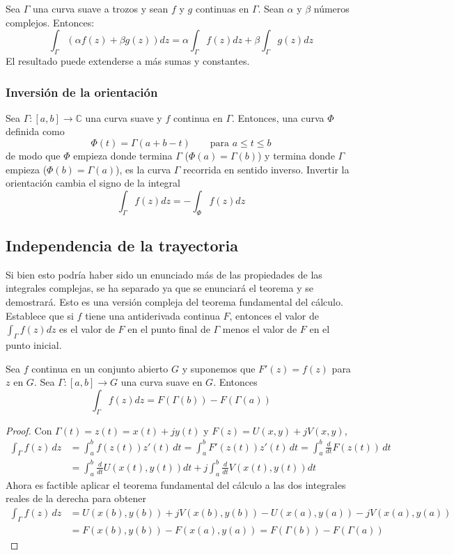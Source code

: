 Sea $\Gamma$ una curva suave a trozos y sean $f$ y $g$ continuas en $\Gamma$. Sean $\alpha$ y $\beta$ números complejos. Entonces:
$$
\int_\Gamma (\alpha f(z)+\beta g(z))dz = \alpha \int_\Gamma f(z) dz + \beta \int_\Gamma g(z)dz
$$
El resultado puede extenderse a más sumas y constantes.

\subsubsection{Inversión de la orientación}

Sea $\Gamma:[a,b]\to\mathbb{C}$ una curva suave y $f$ continua en $\Gamma$. Entonces, una curva $\varPhi$ definida como
$$
\varPhi(t)=\Gamma(a+b-t) \qquad \text{para } a\leqslant t \leqslant b
$$
de modo que $\varPhi$ empieza donde termina $\Gamma$ ($\varPhi(a)=\Gamma(b)$) y termina donde $\Gamma$ empieza ($\varPhi(b)=\Gamma(a)$), es la curva $\Gamma$ recorrida en sentido inverso. Invertir la orientación cambia el signo de la integral
$$
\int_\Gamma f(z)dz=-\int_\varPhi f(z)dz
$$

\subsection{Independencia de la trayectoria}

Si bien esto podría haber sido un enunciado más de las propiedades de las integrales complejas, se ha separado ya que se enunciará el teorema y se demostrará. Esto es una versión compleja del teorema fundamental del cálculo. Establece que si $f$ tiene una antiderivada continua $F$, entonces el valor de $\int_\Gamma f(z)dz$ es el valor de $F$ en el punto final de $\Gamma$ menos el valor de $F$ en el punto inicial.

\begin{theorem}\label{teo:independencia_de_la_trayectoria}
  Sea $f$ continua en un conjunto abierto $G$ y suponemos que $F'(z)=f(z)$ para $z$ en $G$. Sea $\Gamma:[a,b]\to G$ una curva suave en $G$. Entonces
  $$
  \int_\Gamma f(z)dz = F(\Gamma(b))-F(\Gamma(a))
  $$
\end{theorem}

\begin{proof}
  Con $\Gamma(t)=z(t)=x(t)+jy(t)$ y $F(z)=U(x,y)+jV(x,y)$,
  \begin{align*}
    \int_\Gamma f(z)\,dz &= \int_a^b f(z(t))z'(t)\,dt = \int_a^b F'(z(t))z'(t)\,dt = \int_a^b \frac{d}{dt}F(z(t))\,dt \\
                         &= \int_a^b \frac{d}{dt} U(x(t),y(t))dt + j\int_a^b \frac{d}{dt}V(x(t),y(t))dt
  \end{align*}
  Ahora es factible aplicar el teorema fundamental del cálculo a las dos integrales reales de la derecha para obtener
  \begin{align*}
    \int_\Gamma f(z)\,dz &= U(x(b),y(b))+jV(x(b),y(b))-U(x(a),y(a))-jV(x(a),y(a)) \\ 
                         &= F(x(b),y(b))-F(x(a),y(a)) = \boxed{F(\Gamma(b))-F(\Gamma(a))}
  \end{align*}
\end{proof}

